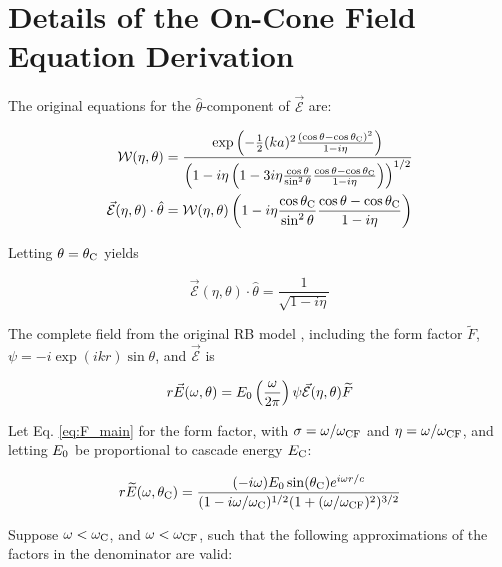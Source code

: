 \documentclass[amsmath,amssymb,aps,prd,10pt,twocolumn]{revtex4}
\begin{document}
\section{Details of the On-Cone Field Equation Derivation}
\label{app:a}

The original equations for the $\hat{\theta}$-component of $\vec{\mathcal{E}}$ are:

\begin{align}
\mathcal{W}(\eta,\theta) &= \frac{\exp\left( -\frac{1}{2}(ka)^2 \frac{(\cos\theta - \cos\theta_{\rm C})^2}{1-i\eta} \right)}{\left(1-i\eta\left(1-3i\eta \frac{\cos\theta}{\sin^2\theta}\frac{\cos\theta - \cos\theta_{\rm C}}{1-i\eta}\right) \right)^{1/2}} \\
\vec{\mathcal{E}}(\eta,\theta) \cdot \hat{\theta} &= \mathcal{W}(\eta,\theta) \left(1-i\eta \frac{\cos\theta_{\rm C}}{\sin^2\theta} \frac{\cos\theta - \cos\theta_{\rm C}}{1-i\eta} \right) \label{app:eq:big_one_1}
\end{align}

Letting $\theta = \theta_{\rm C}$ yields

\begin{equation}
\vec{\mathcal{E}}(\eta,\theta) \cdot \hat{\theta} = \frac{1}{\sqrt{1-i\eta}}
\end{equation}

The complete field from the original RB model \cite{10.1103/physrevd.65.016003}, including the form factor $\widetilde{F}$, $\psi = -i \exp(ikr) \sin\theta$, and $\vec{\mathcal{E}}$ is 

\begin{equation}
r\vec{E}(\omega,\theta) = E_{\rm 0} \left( \frac{\omega}{2\pi} \right) \psi \vec{\mathcal{E}}(\eta,\theta) \widetilde{F} \label{app:eq:main}
\end{equation}

Let Eq. \ref{eq:F_main} for the form factor, with $\sigma = \omega/\omega_{\rm CF}$ and $\eta = \omega/\omega_{\rm CF}$, and letting $E_{\rm 0}$ be proportional to cascade energy $E_{\rm C}$:

\begin{equation}
r\widetilde{E}(\omega,\theta_{\rm C}) = \frac{(-i\omega) E_0 \sin(\theta_{\rm C}) e^{i\omega r/c}}{(1-i \omega/\omega_{\rm C})^{1/2} (1+(\omega/\omega_{\rm CF})^2)^{3/2}} \label{app:eq:re_1}
\end{equation}

Suppose $\omega < \omega_{\rm C}$, and $\omega < \omega_{\rm CF}$, such that the following approximations of the factors in the denominator are valid:
\end{document}
